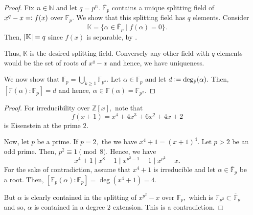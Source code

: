 \existencefinfields*\label{thm:existencefinfields2}
\begin{flushright}\hyperref[thm:existencefinfields]{\upsym}\end{flushright}
\begin{proof}
    Fix $n \in \mathbb{N}$ and let $q = p^n.$ $\overline{\mathbb{F}}_p$ contains a unique splitting field of $x^q - x =\vcentcolon f(x)$ over $\mathbb{F}_p.$ We show that this splitting field has $q$ elements. Consider
    \begin{equation*} 
        \mathbb{K} = \{\alpha \in \overline{\mathbb{F}}_p \mid f(\alpha) = 0\}.
    \end{equation*}
    Then, ${\left\lvert \mathbb{K} \right\lvert} = q$ since $f(x)$ is separable, by . 

    Thus, $\mathbb{K}$ is the desired splitting field. Conversely any other field with $q$ elements would be the set of roots of $x^q - x$ and hence, we have uniqueness.

    We now show that $\overline{\mathbb{F}}_p = \bigcup_{k \ge 1}\mathbb{F}_{p^k}.$ Let $\alpha \in \overline{\mathbb{F}}_p$ and let $d \vcentcolon= \deg_{\mathbb{F}}(\alpha).$ Then, $[\mathbb{F}(\alpha) : \mathbb{F}_p] = d$ and hence, $\alpha \in \mathbb{F}(\alpha) = \mathbb{F}_{p^d}.$
\end{proof}


\xfourplusone*\label{prop:xfourplusone2}
\begin{flushright}\hyperref[prop:xfourplusone]{\upsym}\end{flushright}
\begin{proof}
    For irreducibility over $\mathbb{Z}[x],$ note that
    \begin{equation*} 
        f(x + 1) = x^4 + 4x^3 + 6x^2 + 4x + 2
    \end{equation*}
    is Eisenstein at the prime $2.$

    Now, let $p$ be a prime. If $p = 2,$ the we have $x^4 + 1 = (x + 1)^4.$ Let $p > 2$ be an odd prime. Then, $p^2 \equiv 1 \pmod{8}.$ Hence, we have
    \begin{equation*} 
        x^4 + 1 \mid x^8 - 1 \mid x^{p^2 - 1} - 1 \mid x^{p^2} - x.
    \end{equation*}
    For the sake of contradiction, assume that $x^4 + 1$ is irreducible and let $\alpha \in \overline{\mathbb{F}}_p$ be a root. Then, $[\mathbb{F}_p(\alpha) : \mathbb{F}_p] = \deg(x^4 + 1) = 4.$

    But $\alpha$ is clearly contained in the splitting of $x^{p^2} - x$ over $\mathbb{F}_p,$ which is $\mathbb{F}_{p^2} \subset \overline{\mathbb{F}}_p$ and so, $\alpha$ is contained in a degree $2$ extension. This is a contradiction.
\end{proof}

